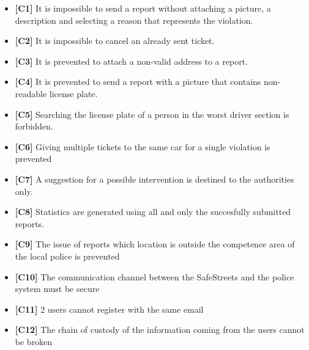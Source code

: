 \begin{itemize}
	\item \textbf{[\hypertarget{C1}{C1}]} It is impossible to send a report without attaching a picture, a description and selecting a reason that represents the violation. 
	\item \textbf{[\hypertarget{C2}{C2}]} It is impossible to cancel an already sent ticket. 
	\item \textbf{[\hypertarget{C3}{C3}]} It is prevented to attach a non-valid address to a report.
	\item \textbf{[\hypertarget{C4}{C4}]} It is prevented to send a report with a picture that contains non-readable license plate. 
	\item \textbf{[\hypertarget{C5}{C5}]} Searching the license plate of a person in the worst driver section is forbidden.
	\item \textbf{[\hypertarget{C6}{C6}]} Giving multiple tickets to the same car for a single violation is prevented
	\item \textbf{[\hypertarget{C7}{C7}]} A suggestion for a possible intervention is destined to the authorities only.
	\item \textbf{[\hypertarget{C8}{C8}]} Statistics are generated using all and only the succesfully submitted reports.
	\item \textbf{[\hypertarget{C9}{C9}]} The issue of reports which location is outside the competence area of the local police is prevented
	\item \textbf{[\hypertarget{C10}{C10}]} The communication channel between the SafeStreets and the police system must be secure
	\item \textbf{[\hypertarget{C11}{C11}]} 2 users cannot register with the same email
	\item \textbf{[\hypertarget{C12}{C12}]} The chain of custody of the information coming from the users cannot be broken
\end{itemize}
\clearpage
